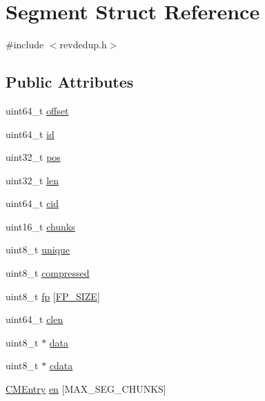 \hypertarget{structSegment}{\section{\-Segment \-Struct \-Reference}
\label{structSegment}
}


{\ttfamily \#include $<$revdedup.\-h$>$}

\subsection*{\-Public \-Attributes}
\begin{DoxyCompactItemize}
\item 
uint64\-\_\-t \hyperlink{structSegment_a22561ad92e73f5ed788d9da666db78d2}{offset}
\item 
uint64\-\_\-t \hyperlink{structSegment_ab4221d4fc32571e537286e0b99ee7c71}{id}
\item 
uint32\-\_\-t \hyperlink{structSegment_afcfb83f8948563d50c22c80577ff765d}{pos}
\item 
uint32\-\_\-t \hyperlink{structSegment_aabdacebc169cc6edc842093f74ca2ad4}{len}
\item 
uint64\-\_\-t \hyperlink{structSegment_ace61c04c2a87687951bdf781ec0c2a6d}{cid}
\item 
uint16\-\_\-t \hyperlink{structSegment_a1a091314931404d17994b3c0e5e6952c}{chunks}
\item 
uint8\-\_\-t \hyperlink{structSegment_a1fcdfe7f7de73dbcc6078302e6e932a3}{unique}
\item 
uint8\-\_\-t \hyperlink{structSegment_a04120222445f6286ab7ff9441a6283ff}{compressed}
\item 
uint8\-\_\-t \hyperlink{structSegment_ad1974f1d77fe441042034a92977879df}{fp} \mbox{[}\hyperlink{revdedup_8h_a5147a30bb976e44355fd0559f9d10abe}{\-F\-P\-\_\-\-S\-I\-Z\-E}\mbox{]}
\item 
uint64\-\_\-t \hyperlink{structSegment_a9347d30011ac2acb00e4f023b19a614d}{clen}
\item 
uint8\-\_\-t $\ast$ \hyperlink{structSegment_a40329b70e2e70cc9b8140c7ac4e60169}{data}
\item 
uint8\-\_\-t $\ast$ \hyperlink{structSegment_a414dd5e3ff8b23b3b85354a2e070a1db}{cdata}
\item 
\hyperlink{structCMEntry}{\-C\-M\-Entry} \hyperlink{structSegment_a29a46e833355572e9929320f144cfc77}{en} \mbox{[}\-M\-A\-X\-\_\-\-S\-E\-G\-\_\-\-C\-H\-U\-N\-K\-S\mbox{]}
\end{DoxyCompactItemize}


